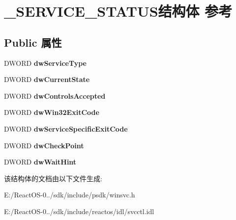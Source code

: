 \hypertarget{struct___s_e_r_v_i_c_e___s_t_a_t_u_s}{}\section{\+\_\+\+S\+E\+R\+V\+I\+C\+E\+\_\+\+S\+T\+A\+T\+U\+S结构体 参考}
\label{struct___s_e_r_v_i_c_e___s_t_a_t_u_s}
\subsection*{Public 属性}
\begin{DoxyCompactItemize}
\item 
\mbox{\label{struct___s_e_r_v_i_c_e___s_t_a_t_u_s_a062d879420f5563add5a8bb6b2c73cc4}} 
D\+W\+O\+RD {\bfseries dw\+Service\+Type}
\item 
\mbox{\label{struct___s_e_r_v_i_c_e___s_t_a_t_u_s_a69e88da64df7ae2bf0a10b87de0ae2a1}} 
D\+W\+O\+RD {\bfseries dw\+Current\+State}
\item 
\mbox{\label{struct___s_e_r_v_i_c_e___s_t_a_t_u_s_a477035796fc2abade00f3520855c6061}} 
D\+W\+O\+RD {\bfseries dw\+Controls\+Accepted}
\item 
\mbox{\label{struct___s_e_r_v_i_c_e___s_t_a_t_u_s_a1871c50fb976272ea4e4cfcced216327}} 
D\+W\+O\+RD {\bfseries dw\+Win32\+Exit\+Code}
\item 
\mbox{\label{struct___s_e_r_v_i_c_e___s_t_a_t_u_s_afe7dffa2a09c12e0d405345cdfc8ed3d}} 
D\+W\+O\+RD {\bfseries dw\+Service\+Specific\+Exit\+Code}
\item 
\mbox{\label{struct___s_e_r_v_i_c_e___s_t_a_t_u_s_ae1178cc4d611d1cc9dc8a7b2f9fae953}} 
D\+W\+O\+RD {\bfseries dw\+Check\+Point}
\item 
\mbox{\label{struct___s_e_r_v_i_c_e___s_t_a_t_u_s_a613af9f7b77ad156106297cc1a5277a2}} 
D\+W\+O\+RD {\bfseries dw\+Wait\+Hint}
\end{DoxyCompactItemize}


该结构体的文档由以下文件生成\+:\begin{DoxyCompactItemize}
\item 
E\+:/\+React\+O\+S-\/0../sdk/include/psdk/winsvc.\+h\item 
E\+:/\+React\+O\+S-\/0../sdk/include/reactos/idl/svcctl.\+idl\end{DoxyCompactItemize}

